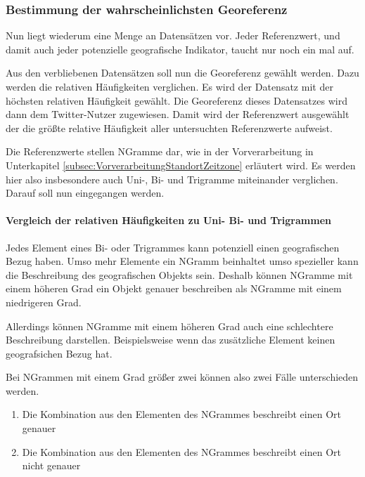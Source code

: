 			\subsubsection{Bestimmung der wahrscheinlichsten Georeferenz} 

				Nun liegt wiederum eine Menge an Datensätzen vor.
				Jeder Referenzwert, und damit auch jeder potenzielle geografische Indikator, taucht nur noch ein mal auf. 

				Aus den verbliebenen Datensätzen soll nun die Georeferenz gewählt werden. 
				Dazu werden die relativen Häufigkeiten verglichen.
				Es wird der Datensatz mit der höchsten relativen Häufigkeit gewählt.
				Die Georeferenz dieses Datensatzes wird dann dem Twitter-Nutzer zugewiesen. 
				Damit wird der Referenzwert ausgewählt der die größte relative Häufigkeit aller untersuchten Referenzwerte aufweist. 

				Die Referenzwerte stellen NGramme dar, wie in der Vorverarbeitung in Unterkapitel \ref{subsec:VorverarbeitungStandortZeitzone} erläutert wird.
				Es werden hier also insbesondere auch Uni-, Bi- und Trigramme miteinander verglichen.
				Darauf soll nun eingegangen werden.

				\paragraph{Vergleich der relativen Häufigkeiten zu Uni- Bi- und Trigrammen}

					Jedes Element eines Bi- oder Trigrammes kann potenziell einen geografischen Bezug haben. 
					Umso mehr Elemente ein NGramm beinhaltet umso spezieller kann die Beschreibung des geografischen Objekts sein.
					Deshalb können NGramme mit einem höheren Grad ein Objekt genauer beschreiben als NGramme mit einem niedrigeren Grad.

					Allerdings können NGramme mit einem höheren Grad auch eine schlechtere Beschreibung darstellen. 
					Beispielsweise wenn das zusätzliche Element keinen geografsichen Bezug hat.

					Bei NGrammen mit einem Grad größer zwei können also zwei Fälle unterschieden werden.

					\begin{enumerate}
						\item Die Kombination aus den Elementen des NGrammes beschreibt einen Ort genauer
						\item Die Kombination aus den Elementen des NGrammes beschreibt einen Ort nicht genauer
					\end{enumerate}

